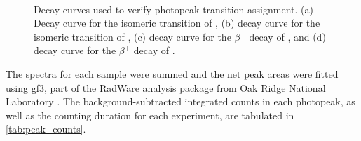 \begin{figure}
    \centering
    \\
    \caption{Decay curves used to verify photopeak transition assignment. (a) Decay curve for the isomeric transition of  \cite{Hansen1974}, (b) decay curve for the isomeric transition of  \cite{Blachot2010a}, (c) decay curve for the $\beta^-$ decay of  \cite{Blachot2010}, and (d) decay curve for the $\beta^+$ decay of  \cite{Singh2007}.}
     \label{fig:decay_curves}
\end{figure}

The spectra for each sample were summed and the net peak areas were fitted using gf3, part of the RadWare analysis package from Oak Ridge National Laboratory   \cite{radford2000radware, Radford1995}.
The background-subtracted integrated counts in each photopeak, as well as the counting duration for each experiment, are tabulated in \autoref{tab:peak_counts}.

